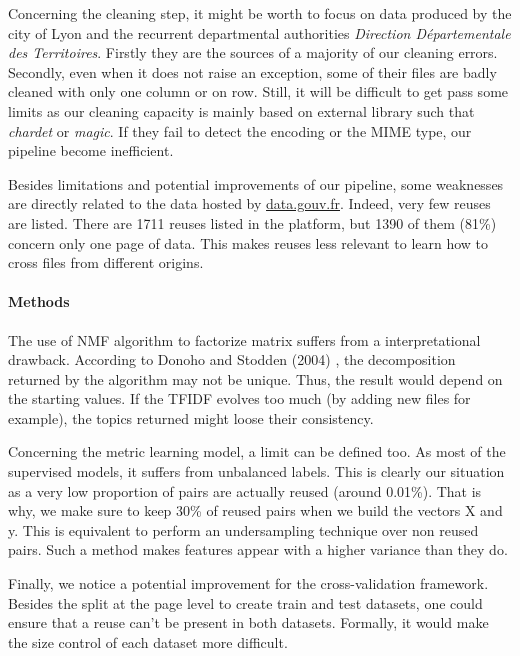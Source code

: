\documentclass[a4paper]{article}
\begin{document}
	Concerning the cleaning step, it might be worth to focus on data produced by the city of Lyon and the recurrent departmental authorities \emph{Direction Départementale des Territoires}. Firstly they are the sources of a majority of our cleaning errors. Secondly, even when it does not raise an exception, some of their files are badly cleaned with only one column or on row. Still, it will be difficult to get pass some limits as our cleaning capacity is mainly based on external library such that \emph{chardet} or \emph{magic}. If they fail to detect the encoding or the MIME type, our pipeline become inefficient.
	
	Besides limitations and potential improvements of our pipeline, some weaknesses are directly related to the data hosted by \href{http://www.data.gouv.fr/fr/}{data.gouv.fr}. Indeed, very few reuses are listed. There are 1711 reuses listed in the platform, but 1390 of them (81\%) concern only one page of data. This makes reuses less relevant to learn how to cross files from different origins.
	
	\paragraph{Methods}
	
	The use of \ac{NMF} algorithm to factorize matrix suffers from a interpretational drawback. According to Donoho and Stodden (2004) \cite{ref1}, the decomposition returned by the algorithm may not be unique. Thus, the result would depend on the starting values. If the \ac{TFIDF} evolves too much (by adding new files for example), the topics returned might loose their consistency. 
	
	Concerning the metric learning model, a limit can be defined too. As most of the supervised models, it suffers from unbalanced labels. This is clearly our situation as a very low proportion of pairs are actually reused (around 0.01\%). That is why, we make sure to keep 30\% of reused pairs when we build the vectors X and y. This is equivalent to perform an undersampling technique over non reused pairs. Such a method makes features appear with a higher variance than they do.
	
	Finally, we notice a potential improvement for the cross-validation framework. Besides the split at the page level to create train and test datasets, one could ensure that a reuse can't be present in both datasets. Formally, it would make the size control of each dataset more difficult. 
		
\end{document}
